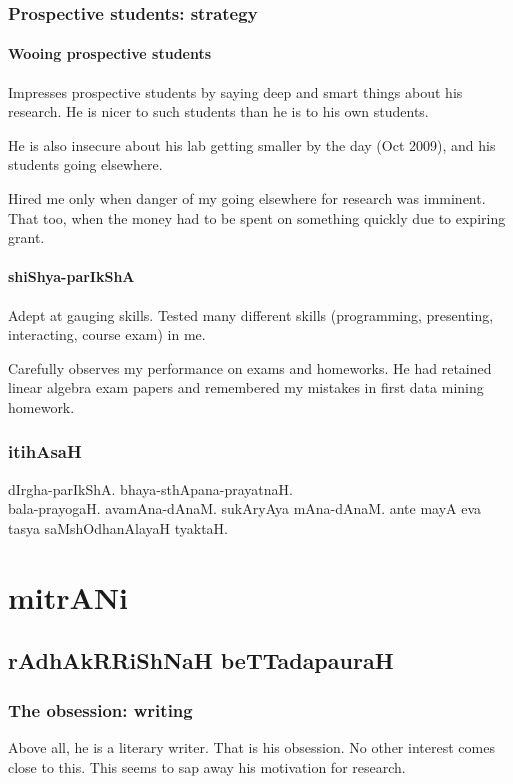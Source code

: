 \documentclass[oneside, article]{memoir}
\begin{document}
\section{Prospective students: strategy}
\subsection{Wooing prospective students}
Impresses prospective students by saying deep and smart things about his research. He is nicer to such students than he is to his own students.

He is also insecure about his lab getting smaller by the day (Oct 2009), and his students going elsewhere.

Hired me only when danger of my going elsewhere for research was imminent. That too, when the money had to be spent on something quickly due to expiring grant.

\subsection{shiShya-parIkShA}
Adept at gauging skills. Tested many different skills (programming, presenting, interacting, course exam) in me.

Carefully observes my performance on exams and homeworks. He had retained linear algebra exam papers and remembered my mistakes in first data mining homework.

\section{itihAsaH}
dIrgha-parIkShA. bhaya-sthApana-prayatnaH. \\bala-prayogaH. avamAna-dAnaM. sukAryAya mAna-dAnaM. ante mayA eva tasya saMshOdhanAlayaH tyaktaH.

\part{mitrANi}
\chapter{rAdhAkRRiShNaH beTTadapauraH}
\section{The obsession: writing}
Above all, he is a literary writer. That is his obsession. No other interest comes close to this. This seems to sap away his motivation for research.
\end{document}
